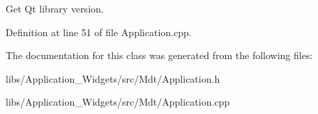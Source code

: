 Get Qt library version. 



Definition at line 51 of file Application.\+cpp.



The documentation for this class was generated from the following files\+:\begin{DoxyCompactItemize}
\item 
libs/\+Application\+\_\+\+Widgets/src/\+Mdt/Application.\+h\item 
libs/\+Application\+\_\+\+Widgets/src/\+Mdt/Application.\+cpp\end{DoxyCompactItemize}

